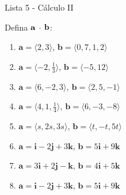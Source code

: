 \documentclass[11pt,a4paper]{article}
\begin{document}
	\begin{center}
		\Large Lista 5 - Cálculo II
	\end{center}
	

	Defina  ${\bf a}$ $\cdot$ ${\bf b}$:
	
	\begin{enumerate}
	
	\item $\textbf{a} = \langle 2,3\rangle$, \quad	$\textbf{b} = \langle 0,7,1,2\rangle$ 
	\item $\textbf{a} = \langle -2,\frac{1}{3}\rangle$, \quad 	$\textbf{b} = \langle -5, 12\rangle$ 
	\item $\textbf{a} = \langle 6,-2, 3\rangle$, \quad	$\textbf{b} = \langle 2,5,-1\rangle$  	
	\item $\textbf{a} = \langle 4,1, \frac{1}{4}\rangle$, \quad	$\textbf{b} = \langle 6, -3, -8\rangle$ 
	\item $\textbf{a} = \langle s,2s,3s\rangle$, \quad	$\textbf{b} = \langle t, -t, 5t\rangle$ 
	\item $\textbf{a} = \textbf{i} - 2\textbf{j} + 3\textbf{k}$, \quad $\textbf{b} = 5\textbf{i} + 						  9\textbf{k}$ 
	\item $\textbf{a} = 3\textbf{i} + 2\textbf{j} - \textbf{k}$, \quad $\textbf{b} = 4\textbf{i} + 					      5\textbf{k}$ 
	\item $\textbf{a} = \textbf{i} - 2\textbf{j} + 3\textbf{k}$, \quad $\textbf{b} = 5\textbf{i} + 						  9\textbf{k}$
	

\end{enumerate}
\end{document}
